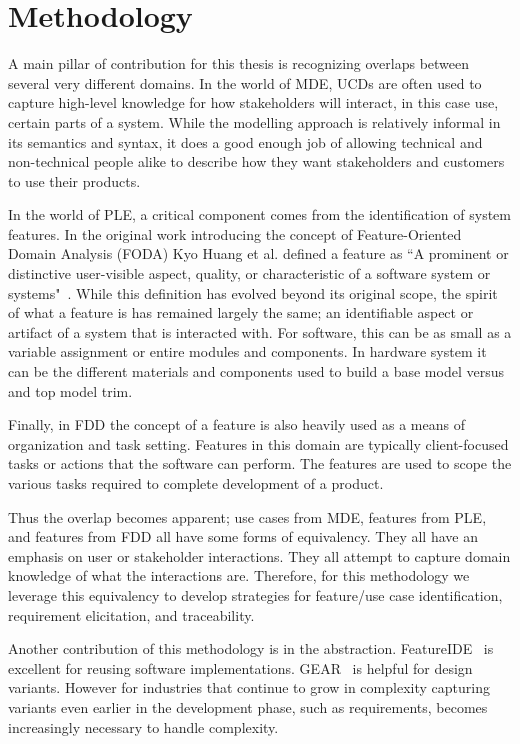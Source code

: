 \chapter{Methodology}



A main pillar of contribution for this thesis is recognizing overlaps between several very different domains. In the world of \ac{MDE}, \ac{UCD}s are often used to capture high-level knowledge for how stakeholders will interact, in this case use, certain parts of a system. While the modelling approach is relatively informal in its semantics and syntax, it does a good enough job of allowing technical and non-technical people alike to describe how they want stakeholders and customers to use their products.

In the world of \ac{PLE}, a critical component comes from the identification of system features. In the original work introducing the concept of Feature-Oriented Domain Analysis (FODA) Kyo Huang et al. defined a feature as ``A prominent or distinctive user-visible aspect, quality, or characteristic of a software system or systems"~\cite{kang1990feature}. While this definition has evolved beyond its original scope, the spirit of what a feature is has remained largely the same; an identifiable aspect or artifact of a system that is interacted with. For software, this can be as small as a variable assignment or entire modules and components. In hardware system it can be the different materials and components used to build a base model versus and top model trim.

Finally, in \ac{FDD} the concept of a feature is also heavily used as a means of organization and task setting. Features in this domain are typically client-focused tasks or actions that the software can perform. The features are used to scope the various tasks required to complete development of a product. 

Thus the overlap becomes apparent; use cases from \ac{MDE}, features from \ac{PLE}, and features from \ac{FDD} all have some forms of equivalency. They all have an emphasis on user or stakeholder interactions. They all attempt to capture domain knowledge of what the interactions are. Therefore, for this methodology we leverage this equivalency to develop strategies for feature/use case identification, requirement elicitation, and traceability.

Another contribution of this methodology is in the abstraction. FeatureIDE~\cite{thum2014featureide} is excellent for reusing software  implementations. GEAR~\cite{GEARS} is helpful for design variants. However for industries that continue to grow in complexity capturing variants even earlier in the development phase, such as requirements, becomes increasingly necessary to handle complexity.

